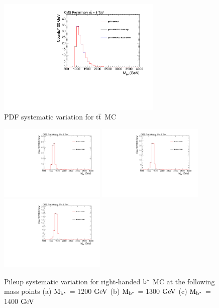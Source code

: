 \begin{figure}[htcb]
\begin{center}
\includegraphics[width=0.7\textwidth]{AN-14-049/figs/TTbar_PdfScaleNNPDF23.pdf}
\caption{PDF systematic variation for $\mathrm{t\overline{t}}$ MC}
\label{figs:bsttbarPDF}
\end{center}
\end{figure}

\begin{figure}[htcb]
\begin{center}
\includegraphics[width=0.45\textwidth]{AN-14-049/figs/Signal_M1200_PileupReweighting.pdf}
\includegraphics[width=0.45\textwidth]{AN-14-049/figs/Signal_M1300_PileupReweighting.pdf}
\includegraphics[width=0.45\textwidth]{AN-14-049/figs/Signal_M1400_PileupReweighting.pdf}
\caption{
Pileup systematic variation for right-handed $\mathrm{b}^{*}$  MC at the following mass points
(a) $\mathrm{M_{\mathrm{b}^{*}}}$ = 1200$~\mathrm{GeV}$ 
(b) $\mathrm{M_{\mathrm{b}^{*}}}$ = 1300$~\mathrm{GeV}$
(c) $\mathrm{M_{\mathrm{b}^{*}}}$ = 1400$~\mathrm{GeV}$ 
}
\label{figs:bssignalPU}
\end{center}
\end{figure}

